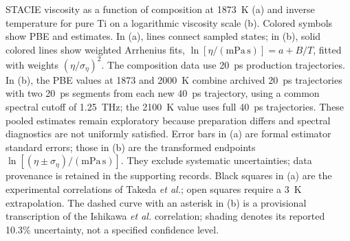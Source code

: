 \caption{STACIE viscosity as a function of composition at 1873~K (a) and inverse temperature for pure Ti on a logarithmic viscosity scale (b). Colored symbols show PBE and \rscan{} estimates. In (a), lines connect sampled states; in (b), solid colored lines show weighted Arrhenius fits, $\ln[\eta/(\mathrm{mPa\,s})]=a+B/T$, fitted with weights $(\eta/\sigma_\eta)^2$. The composition data use 20~ps production trajectories. In (b), the PBE values at 1873 and 2000~K combine archived 20~ps trajectories with two 20~ps segments from each new 40~ps trajectory, using a common spectral cutoff of 1.25~THz; the 2100~K value uses full 40~ps trajectories. These pooled estimates remain exploratory because preparation differs and spectral diagnostics are not uniformly satisfied. Error bars in (a) are formal estimator standard errors; those in (b) are the transformed endpoints $\ln[(\eta\pm\sigma_\eta)/(\mathrm{mPa\,s})]$. They exclude systematic uncertainties; data provenance is retained in the supporting records. Black squares in (a) are the experimental correlations of Takeda \textit{et al.}\cite{Takeda2025}; open squares require a 3~K extrapolation. The dashed curve with an asterisk in (b) is a provisional transcription of the Ishikawa \textit{et al.}\cite{Ishikawa2012} correlation; shading denotes its reported 10.3\% uncertainty, not a specified confidence level.}
